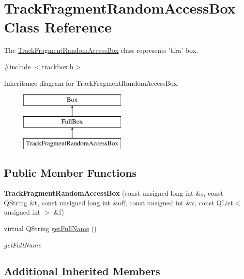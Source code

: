 \hypertarget{class_track_fragment_random_access_box}{\section{Track\-Fragment\-Random\-Access\-Box Class Reference}
\label{class_track_fragment_random_access_box}
}


The \hyperlink{class_track_fragment_random_access_box}{Track\-Fragment\-Random\-Access\-Box} class represents 'tfra' box.  




{\ttfamily \#include $<$trackbox.\-h$>$}

Inheritance diagram for Track\-Fragment\-Random\-Access\-Box\-:\begin{figure}[H]
\begin{center}
\leavevmode
\includegraphics[height=3.000000cm]{class_track_fragment_random_access_box}
\end{center}
\end{figure}
\subsection*{Public Member Functions}
\begin{DoxyCompactItemize}
\item 
\hypertarget{class_track_fragment_random_access_box_a455667d32a0db6b66f58dafed4734830}{{\bfseries Track\-Fragment\-Random\-Access\-Box} (const unsigned long int \&s, const Q\-String \&t, const unsigned long int \&off, const unsigned int \&v, const Q\-List$<$ unsigned int $>$ \&f)}\label{class_track_fragment_random_access_box_a455667d32a0db6b66f58dafed4734830}

\item 
virtual Q\-String \hyperlink{class_track_fragment_random_access_box_afeb1c2b67373428008a209cf01f6df10}{get\-Full\-Name} ()
\begin{DoxyCompactList}\small\item\em get\-Full\-Name \end{DoxyCompactList}\end{DoxyCompactItemize}
\subsection*{Additional Inherited Members}


